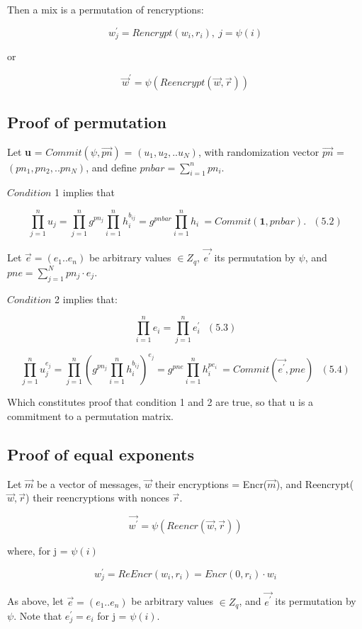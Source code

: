 \documentclass{article}
\begin{document}
Then a mix is a permutation of rencryptions:

\[
w_{j}^{\prime}=Rencrypt(w_{i},r_{i}),\ j=\psi(i)
\]

or

\[
\vec{w}^{\prime}=\psi(Reencrypt(\vec{w},\vec{r}))
\]


\subsection*{Proof of permutation}

Let \textbf{u} = $Commit(\psi,\vec{pn})$ = $(u_{1},u_{2},..u_{N})$,
with randomization vector $\vec{pn}$ = $(pn_{1},pn_{2},..pn_{N})$,
and define $pnbar=\sum_{i=1}^{n}pn_{i}$.

$Condition$ 1 implies that

\[
\prod_{j=1}^{n}u_{j}=\prod_{j=1}^{n}g^{pn_{j}}\prod_{i=1}^{n}h_{i}^{b_{ij}}=g^{pnbar}\prod_{i=1}^{n}h_{i}\ =Commit(\textbf{1},pnbar).\ \ \ (5.2)
\]

Let $\vec{e}=(e_{1}..e_{n})$ be arbitrary values $\in Z_{q},\ \vec{e^{\prime}}$
its permutation by $\psi$, and $pne=\sum_{j=1}^{N}{pn_{j}\cdot e_{j}}$.

$Condition$ 2 implies that:

\[
\prod_{i=1}^{n}e_{i}=\prod_{j=1}^{n}e_{i}^{\prime}\ \ \ (5.3)
\]

\[
\prod_{j=1}^{n}u_{j}^{e_{j}}=\prod_{j=1}^{n}(g^{pn_{j}}\prod_{i=1}^{n}h_{i}^{b_{ij}})^{e_{j}}=g^{pne}\prod_{i=1}^{n}h_{i}^{pe_{i}}\ =Commit(\vec{e^{\prime}},pne)\ \ \ (5.4)
\]

Which constitutes proof that condition 1 and 2 are true, so that u
is a commitment to a permutation matrix.

\subsection*{Proof of equal exponents}

Let $\vec{m}$ be a vector of messages, $\vec{w}$ their encryptions
= Encr($\vec{m}$), and Reencrypt($\vec{w},\vec{r}$) their reencryptions
with nonces $\vec{r}$.

\[
\vec{w^{\prime}}=\psi(Reencr(\vec{w},\vec{r}))
\]

where, for j = $\psi(i)$

\[
w_{j}^{\prime}=ReEncr(w_{i},r_{i})=Encr(0,r_{i})\cdot w_{i}
\]

As above, let $\vec{e}=(e_{1}..e_{n})$ be arbitrary values $\in Z_{q}$,
and $\vec{e^{\prime}}$ its permutation by $\psi$. Note that $e_{j}^{\prime}=e_{i}$
for j = $\psi(i)$.
\end{document}
